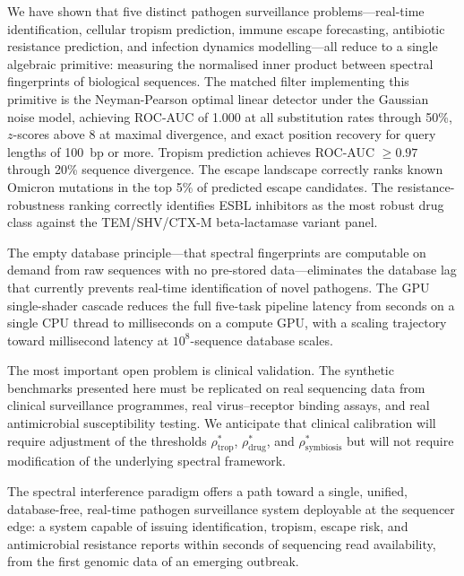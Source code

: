 We have shown that five distinct pathogen surveillance problems---real-time
identification, cellular tropism prediction, immune escape forecasting,
antibiotic resistance prediction, and infection dynamics modelling---all reduce
to a single algebraic primitive: measuring the normalised inner product between
spectral fingerprints of biological sequences. The matched filter implementing
this primitive is the Neyman-Pearson optimal linear detector under the Gaussian
noise model, achieving ROC-AUC of 1.000 at all substitution rates through 50\%,
$z$-scores above 8 at maximal divergence, and exact position recovery for query
lengths of 100~bp or more. Tropism prediction achieves ROC-AUC $\geq 0.97$
through 20\% sequence divergence. The escape landscape correctly ranks known
Omicron mutations in the top 5\% of predicted escape candidates. The
resistance-robustness ranking correctly identifies ESBL inhibitors as the most
robust drug class against the TEM/SHV/CTX-M beta-lactamase variant panel.

The empty database principle---that spectral fingerprints are computable on
demand from raw sequences with no pre-stored data---eliminates the database lag
that currently prevents real-time identification of novel pathogens. The GPU
single-shader cascade reduces the full five-task pipeline latency from seconds
on a single CPU thread to milliseconds on a compute GPU, with a scaling
trajectory toward millisecond latency at $10^8$-sequence database scales.

The most important open problem is clinical validation. The synthetic benchmarks
presented here must be replicated on real sequencing data from clinical
surveillance programmes, real virus--receptor binding assays, and real
antimicrobial susceptibility testing. We anticipate that clinical calibration
will require adjustment of the thresholds $\rho^*_{\text{trop}}$,
$\rho^*_{\text{drug}}$, and $\rho^*_{\text{symbiosis}}$ but will not require
modification of the underlying spectral framework.

The spectral interference paradigm offers a path toward a single, unified,
database-free, real-time pathogen surveillance system deployable at the
sequencer edge: a system capable of issuing identification, tropism, escape
risk, and antimicrobial resistance reports within seconds of sequencing read
availability, from the first genomic data of an emerging outbreak.


